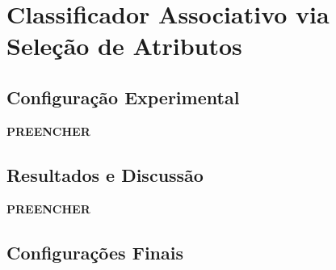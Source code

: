\chapter{Classificador Associativo via Seleção de Atributos}\label{cap:cba-fs}

\section{Configuração Experimental}\label{sec:conf-exp}

\textbf{PREENCHER}

\section{Resultados e Discussão}\label{sec:result-disc}

\textbf{PREENCHER}

\section{Configurações Finais}\label{sec:proposta-conf-finais}